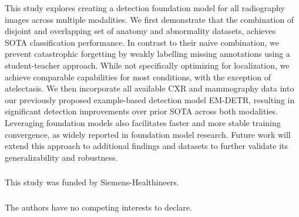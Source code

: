 \documentclass[runningheads]{llncs}
\begin{document}
This study explores creating a detection foundation model for all radiography images across multiple modalities. We first demonstrate that the combination of disjoint and overlapping set of anatomy and abnormality datasets, achieves SOTA classification performance. In contrast to their naive combination, we prevent catastrophic forgetting by weakly labelling missing annotations using a student-teacher approach. While not specifically optimizing for localization, we achieve comparable capabilities for most conditions, with the exception of atelectasis. We then incorporate all available CXR and mammography data into our previously proposed example-based detection model EM-DETR, resulting in significant detection improvements over prior SOTA across both modalities. Leveraging foundation models also facilitates faster and more stable training convergence, as widely reported in foundation model research. Future work will extend this approach to additional findings and datasets to further validate its generalizability and robustness.


\begin{credits}
\subsubsection{\ackname} 
This study was funded by Siemens-Healthineers.

\subsubsection{\discintname}
The authors have no competing interests to declare.

\end{credits}
%
%
%


%
\end{document}
